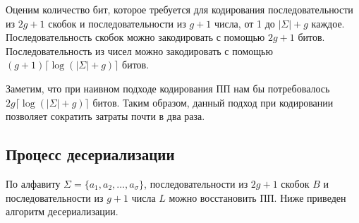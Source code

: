 \documentclass[14pt]{article}
\begin{document}
Оценим количество бит, которое требуется для кодирования последовательности из $2g+1$ скобок и последовательности из $g+1$
числа, от 1 до $|\Sigma|+g$ каждое. Последовательность скобок можно закодировать с помощью $2g+1$ битов. Последовательность из чисел можно
закодировать с помощью $(g+1)\lceil \log(|\Sigma|+g) \rceil$ битов.

Заметим, что при наивном подходе кодирования ПП нам бы потребовалось $2g\lceil \log(|\Sigma|+g) \rceil$ битов.
Таким образом, данный подход при кодировании позволяет сократить затраты почти в два раза.

\subsection{Процесс десериализации}

По алфавиту $\Sigma = \{a_1, a_2, \ldots, a_{\sigma}\}$, последовательности из $2g+1$ скобок $B$ и последовательности
из $g+1$ числа $L$ можно восстановить ПП. Ниже приведен алгоритм десериализации.
\end{document}
